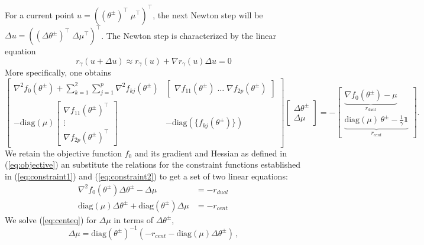 \documentclass[11pt]{article}
\begin{document}
For a current point $u = \left((\theta^{\pm})^{\top} \; \mu^{\top} \right)^{\top}$, the next Newton step will be $\Delta u = \left((\Delta\theta^{\pm})^{\top} \; \Delta\mu^{\top} \right)^{\top}$. The Newton step is characterized by the linear equation
\[r_\gamma(u + \Delta u) \approx r_{\gamma}(u) + \nabla r_{\gamma}(u)\Delta u = 0\] More specifically, one obtains 
\[\begin{bmatrix}
    \nabla^2f_0(\theta^{\pm}) + \sum_{k=1}^2 \sum_{j = 1}^p \nabla^2 f_{kj}(\theta^{\pm}) & \begin{bmatrix} \nabla f_{11}(\theta^{\pm}) \; \ldots \; \nabla f_{2p}(\theta^{\pm})
    \end{bmatrix} \\
    -\text{diag}(\mu) \begin{bmatrix}
      \nabla f_{11}(\theta^{\pm})^{\top} \\
      \vdots \\
      \nabla f_{2p}(\theta^{\pm})^{\top}
    \end{bmatrix}
    &-\text{diag}\left( \{ f_{kj}(\theta^{\pm}) \} \right)
\end{bmatrix}\begin{bmatrix}
\Delta\theta^{\pm} \\[1ex] \Delta\mu
\end{bmatrix} = -\begin{bmatrix}
  \underbrace{\nabla f_0(\theta^{\pm}) - \mu}_{r_{dual}} \\[2ex]
  \underbrace{\text{diag}(\mu) \, \theta^{\pm}
- \frac{1}{\gamma}\mathbf{1}}_{r_{cent}}
\end{bmatrix}.\]
We retain the objective function $f_0$ and its gradient and Hessian as defined in (\ref{eq:objective}) an substitute the relations for the constraint functions established in (\ref{eq:constraint1}) and (\ref{eq:constraint2}) to get a set of two linear equations: %
\begin{align}
\nabla^2f_0(\theta^{\pm})\Delta\theta^{\pm} - \Delta\mu &= -r_{dual}\label{eq:dualeq}\\
\text{diag}(\mu)\Delta\theta^{\pm} + \text{diag}(\theta^{\pm})\Delta\mu &= -r_{cent}\,\label{eq:centeq}
\end{align}
We solve (\ref{eq:centeq}) for $\Delta\mu$ in terms of $\Delta\theta^{\pm}$,
\begin{equation}
\Delta\mu = \text{diag}(\theta^{\pm})^{-1} \left( -r_{cent} - \text{diag}(\mu)\Delta\theta^{\pm} \right)\, ,\label{eq:dellam}
\end{equation}
\end{document}
